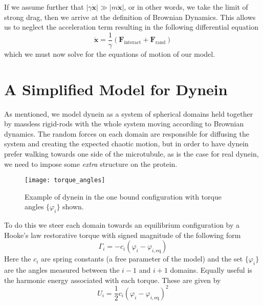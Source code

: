 	If we assume further that $|\gamma\dot{\mathbf{x}}|\gg |m\ddot{\mathbf{x}}|$, or in other words, we take the limit of strong drag, then we arrive at the definition of Brownian Dynamics. This allows us to neglect the acceleration term resulting in the following differential equation
	\begin{equation}
		\dot{\mathbf{x}} = \frac{1}{\gamma}\left( \mathbf{F}_\text{interact} + \mathbf{F}_\text{rand} \right)
	\end{equation}
	which we must now solve for the equations of motion of our model. 
	
	
	\section{A Simplified Model for Dynein}
	As mentioned, we model dynein as a system of spherical domains held together by massless rigid-rods with the whole system moving according to Brownian dynamics. The random forces on each domain are responsible for diffusing the system and creating the expected chaotic motion, but in order to have dynein prefer walking towards one side of the microtubule, as is the case for real dynein, we need to impose some \textit{extra} structure on the protein. 
	
	\begin{figure}[hbt!]
		\centering
		\texttt{[image: torque\_angles]}
		\caption{Example of dynein in the one bound configuration with torque angles $\{\varphi_i\}$ shown.}
		\label{fig:torque angles}
	\end{figure}
	
	To do this we steer each domain towards an equilibrium configuration by a Hooke's law restorative torque with signed magnitude of the following form
	\begin{equation}
		\Gamma_i = -c_i\left(\varphi_i-\varphi_{i,\text{eq}}\right)
	\end{equation}
	Here the $c_i$ are spring constants (a free parameter of the model) and the set $\{\varphi_i\}$ are the angles measured between the $i-1$ and $i+1$ domains. Equally useful is the harmonic energy associated with each torque. These are given by
	\begin{equation}
		U_i = \frac{1}{2}c_i(\varphi_i-\varphi_{i,\text{eq}})^2
	\end{equation} 
	
